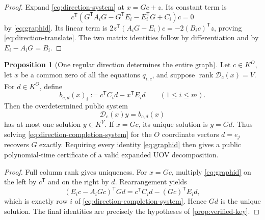 \documentclass[11pt,a4paper]{article}
\theoremstyle{definition}
\newtheorem{proposition}[theorem]{Proposition}
\theoremstyle{remark}
\newcommand{\rank}{\operatorname{rank}}
\begin{document}
\begin{proof}
Expand \eqref{eq:direction-system} at $x=Gc+z$.  Its constant term is
\[
 c^{\mathsf T}(G^{\mathsf T}A_iG-G^{\mathsf T}E_i-E_i^{\mathsf T}G+C_i)c=0
\]
by \eqref{eq:graphid}.  Its linear term is
$2z^{\mathsf T}(A_iG-E_i)c=-2(B_ic)^{\mathsf T}z$, proving \eqref{eq:direction-translate}.  The two matrix identities follow by differentiation and by $E_i-A_iG=B_i$.
\end{proof}

\begin{proposition}[One regular direction determines the entire graph]\label{prop:graph-direction-completion}
Let $c\in K^O$, let $x$ be a common zero of all the equations $q_{i,c}$, and suppose $\rank\mathcal D_c(x)=V$.  For $d\in K^O$, define
\begin{equation}\label{eq:direction-rhs}
 b_{c,d}(x)_i:=c^{\mathsf T}C_id-x^{\mathsf T}E_id
 \qquad(1\le i\le m).
\end{equation}
Then the overdetermined public system
\begin{equation}\label{eq:direction-completion-system}
 \mathcal D_c(x)y=b_{c,d}(x)
\end{equation}
has at most one solution $y\in K^V$.  If $x=Gc$, its unique solution is $y=Gd$.  Thus solving \eqref{eq:direction-completion-system} for the $O$ coordinate vectors $d=e_j$ recovers $G$ exactly.  Requiring every identity \eqref{eq:graphid} then gives a public polynomial-time certificate of a valid expanded UOV decomposition.
\end{proposition}

\begin{proof}
Full column rank gives uniqueness.  For $x=Gc$, multiply \eqref{eq:graphid} on the left by $c^{\mathsf T}$ and on the right by $d$.  Rearrangement yields
\[
 (E_ic-A_iGc)^{\mathsf T}Gd
 =c^{\mathsf T}C_id-(Gc)^{\mathsf T}E_id,
\]
which is exactly row $i$ of \eqref{eq:direction-completion-system}.  Hence $Gd$ is the unique solution.  The final identities are precisely the hypotheses of \cref{prop:verified-key}.
\end{proof}
\end{document}
